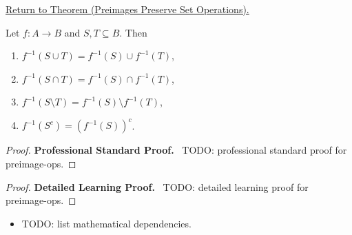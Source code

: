 \newpage
{}
\label{prf:preimage-ops}

\begin{remark*}[Return]
\hyperref[thm:preimage-ops]{Return to Theorem (Preimages Preserve Set Operations).}
\end{remark*}

\begin{theorem*}
Let $f : A \to B$ and $S, T \subseteq B$. Then
\begin{enumerate}[label=(\roman*)]
\item $f^{-1}(S \cup T) = f^{-1}(S) \cup f^{-1}(T)$,
\item $f^{-1}(S \cap T) = f^{-1}(S) \cap f^{-1}(T)$,
\item $f^{-1}(S \setminus T) = f^{-1}(S) \setminus f^{-1}(T)$,
\item $f^{-1}(S^c) = (f^{-1}(S))^c$.
\end{enumerate}
\end{theorem*}

\begin{proof}
\textbf{Professional Standard Proof.}~
TODO: professional standard proof for preimage-ops.
\end{proof}

\begin{proof}
\textbf{Detailed Learning Proof.}~
TODO: detailed learning proof for preimage-ops.
\end{proof}

\begin{remark*}
\end{remark*}

\begin{dependencies}
\begin{itemize}
  \item TODO: list mathematical dependencies.
\end{itemize}
\end{dependencies}

\clearpage
